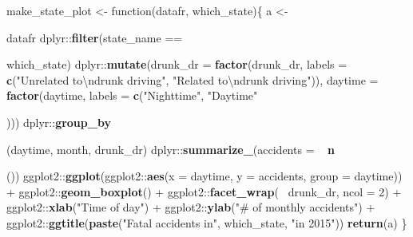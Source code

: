 \documentclass[]{book}
\makeatletter
\newenvironment{Shaded}{\begin{snugshade}}{\end{snugshade}}
\newcommand{\KeywordTok}[1]{\textcolor[rgb]{0.13,0.29,0.53}{\textbf{{#1}}}}
\newcommand{\DataTypeTok}[1]{\textcolor[rgb]{0.13,0.29,0.53}{{#1}}}
\newcommand{\DecValTok}[1]{\textcolor[rgb]{0.00,0.00,0.81}{{#1}}}
\newcommand{\CharTok}[1]{\textcolor[rgb]{0.31,0.60,0.02}{{#1}}}
\newcommand{\StringTok}[1]{\textcolor[rgb]{0.31,0.60,0.02}{{#1}}}
\newcommand{\NormalTok}[1]{{#1}}
\newenvironment{kframe}{%
\medskip{}
\setlength{\fboxsep}{.8em}
 \def\at@end@of@kframe{}%
 \ifinner\ifhmode%
  \def\at@end@of@kframe{\end{minipage}}%
  \begin{minipage}{\columnwidth}%
 \fi\fi%
 \def\FrameCommand##1{\hskip\@totalleftmargin \hskip-\fboxsep
 \colorbox{shadecolor}{##1}\hskip-\fboxsep
     \hskip-\linewidth \hskip-\@totalleftmargin \hskip\columnwidth}%
 \MakeFramed {\advance\hsize-\width
   \@totalleftmargin\z@ \linewidth\hsize
   \@setminipage}}%
 {\par\unskip\endMakeFramed%
 \at@end@of@kframe}
\renewenvironment{Shaded}{\begin{kframe}}{\end{kframe}}
\makeatother
\begin{document}
\begin{Shaded}
\begin{Highlighting}[]
\NormalTok{make_state_plot <-}\StringTok{ }\NormalTok{function(datafr, which_state)\{}
  \NormalTok{a <-}\StringTok{ }\NormalTok{datafr %
\StringTok{    }\NormalTok{dplyr::}\KeywordTok{filter}\NormalTok{(state_name ==}\StringTok{ }\NormalTok{which_state) %
\StringTok{    }\NormalTok{dplyr::}\KeywordTok{mutate}\NormalTok{(}\DataTypeTok{drunk_dr =} \KeywordTok{factor}\NormalTok{(drunk_dr,}
                             \DataTypeTok{labels =} \KeywordTok{c}\NormalTok{(}\StringTok{"Unrelated to}\CharTok{\textbackslash{}n}\StringTok{drunk driving"}\NormalTok{,}
                                        \StringTok{"Related to}\CharTok{\textbackslash{}n}\StringTok{drunk driving"}\NormalTok{)),}
           \DataTypeTok{daytime =} \KeywordTok{factor}\NormalTok{(daytime, }\DataTypeTok{labels =} \KeywordTok{c}\NormalTok{(}\StringTok{"Nighttime"}\NormalTok{, }\StringTok{"Daytime"}\NormalTok{))) %
\StringTok{    }\NormalTok{dplyr::}\KeywordTok{group_by}\NormalTok{(daytime, month, drunk_dr) %
\StringTok{    }\NormalTok{dplyr::}\KeywordTok{summarize_}\NormalTok{(}\DataTypeTok{accidents =} \NormalTok{~}\StringTok{ }\KeywordTok{n}\NormalTok{()) %
\StringTok{    }\NormalTok{ggplot2::}\KeywordTok{ggplot}\NormalTok{(ggplot2::}\KeywordTok{aes}\NormalTok{(}\DataTypeTok{x =} \NormalTok{daytime, }\DataTypeTok{y =} \NormalTok{accidents,}
                                 \DataTypeTok{group =} \NormalTok{daytime)) +}\StringTok{ }
\StringTok{    }\NormalTok{ggplot2::}\KeywordTok{geom_boxplot}\NormalTok{() +}\StringTok{ }
\StringTok{    }\NormalTok{ggplot2::}\KeywordTok{facet_wrap}\NormalTok{(~}\StringTok{ }\NormalTok{drunk_dr, }\DataTypeTok{ncol =} \DecValTok{2}\NormalTok{) +}
\StringTok{    }\NormalTok{ggplot2::}\KeywordTok{xlab}\NormalTok{(}\StringTok{"Time of day"}\NormalTok{) +}\StringTok{ }\NormalTok{ggplot2::}\KeywordTok{ylab}\NormalTok{(}\StringTok{"# of monthly accidents"}\NormalTok{) +}\StringTok{ }
\StringTok{    }\NormalTok{ggplot2::}\KeywordTok{ggtitle}\NormalTok{(}\KeywordTok{paste}\NormalTok{(}\StringTok{"Fatal accidents in"}\NormalTok{, which_state, }\StringTok{"in 2015"}\NormalTok{))}
  \KeywordTok{return}\NormalTok{(a)}
\NormalTok{\}}

}}}}}
\end{Highlighting}
\end{Shaded}
\end{document}
